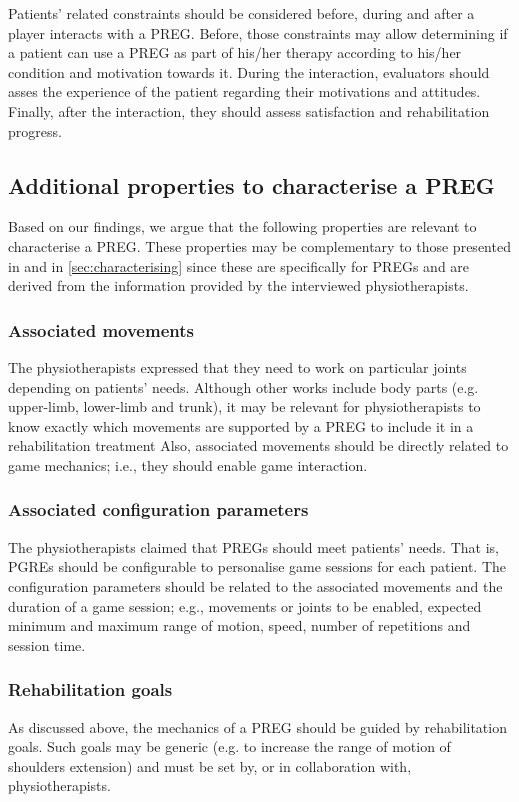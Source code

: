 Patients' related constraints should be considered before, during and after a player interacts with a \ac{PREG}. Before, those constraints may allow determining if a patient can use a \ac{PREG} as part of his/her therapy according to his/her condition and motivation towards it. During the interaction, evaluators should asses the experience of the patient regarding their motivations and attitudes. Finally, after the interaction, they should assess satisfaction and rehabilitation progress.

\subsection{Additional properties to characterise a \ac{PREG}}
Based on our findings, we argue that the following properties are relevant to characterise a \ac{PREG}. These properties may be complementary to those presented in  \autocite{Rego2018} and in \autoref{sec:characterising} since these are specifically for \acp{PREG} and are derived from the information provided by the interviewed physiotherapists.

\subsubsection{Associated movements}
The physiotherapists expressed that they need to work on particular joints depending on patients' needs. Although other works  \autocite{PirovanoAdvisor2012,Rego2018} include body parts (e.g. upper-limb, lower-limb and trunk), it may be relevant for physiotherapists to know exactly which movements are supported by a \ac{PREG} to include it in a rehabilitation treatment Also, associated movements should be directly related to game mechanics; i.e., they should enable game interaction.

\subsubsection{Associated configuration parameters}
The physiotherapists claimed that \acp{PREG} should meet patients' needs. That is, PGREs should be configurable to personalise game sessions for each patient. The configuration parameters should be related to the associated movements and the duration of a game session; e.g., movements or joints to be enabled, expected minimum and maximum range of motion, speed, number of repetitions and session time.

\subsubsection{Rehabilitation goals}
As discussed above, the mechanics of a \ac{PREG} should be guided by rehabilitation goals. Such goals may be generic (e.g. to increase the range of motion of shoulders extension) and must be set by, or in collaboration with, physiotherapists.

